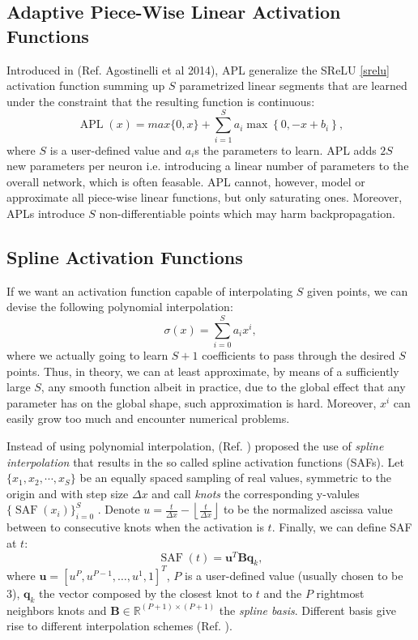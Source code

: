 \documentclass[LaM,binding=0.6cm]{./packages/sapthesis/sapthesis}
\begin{document}
    \subsection{Adaptive Piece-Wise Linear Activation Functions}
    
            Introduced in (Ref. Agostinelli et al 2014), APL generalize the SReLU \ref{srelu} activation function summing up $S$ parametrized linear segments that are
            learned under the constraint that the resulting function is continuous:
            \begin{equation}
                \operatorname{APL}(x) = max \{0, x\} + \sum_{i=1}^{S} a_{i} \max \left\{0,-x+b_{i}\right\},
            \end{equation}
            where $S$ is a user-defined value and $a_i$s the parameters to learn. APL adds $2S$ new parameters per neuron i.e. introducing a linear number of parameters to the overall network, which is often feasable.
            APL cannot, however, model or approximate all piece-wise linear functions, but only saturating ones. Moreover, APLs introduce $S$ non-differentiable points which may harm backpropagation.
    \subsection{Spline Activation Functions}
    If we want an activation function capable of interpolating $S$ given points, we can devise the following polynomial interpolation:
    \begin{equation}
        \sigma(x) = \sum_{i=0}^{S} a_{i} x^{i},
    \end{equation}
    where we actually going to learn $S+1$ coefficients to pass through the desired $S$ points. Thus, in theory, we can at least approximate, by means of
    a sufficiently large $S$, any smooth function albeit in practice, due to the global effect that any parameter has on the global shape, such approximation
    is hard. Moreover, $x^i$ can easily grow too much and encounter numerical problems.
    
    Instead of using polynomial interpolation, (Ref. ) proposed the use of \textit{spline interpolation} that results in the so called spline activation functions (SAFs).
    Let $\{ x_1, x_2, \cdots, x_S \}$ be an equally spaced sampling of real values, symmetric to the origin and with step size $\Delta x$ and call \textit{knots}
    the corresponding y-valules $\{\operatorname{SAF}(x_i)\}^S_{i=0}$ . Denote $u=\frac{t}{\Delta x}-\left\lfloor\frac{t}{\Delta x}\right\rfloor$ to be the normalized ascissa 
    value between to consecutive knots when the activation is $t$. Finally, we can define SAF at $t$:
    \begin{equation}
        \label{saf}
        \operatorname{SAF}(t)=\mathbf{u}^{T} \mathbf{B} \mathbf{q}_{k},
    \end{equation}
    where $\mathbf{u}=\left[u^{P}, u^{P-1}, \ldots, u^{1}, 1\right]^{T}$, $P$ is a user-defined value (usually chosen to be 3), $\mathbf{q}_{k}$ the vector composed by
    the closest knot to $t$ and the $P$ rightmost neighbors knots and $\mathbf{B} \in \mathbb{R}^{(P+1) \times(P+1)}$ the \textit{spline basis}. Different basis give 
    rise to different interpolation schemes (Ref. ).
    
\end{document}

